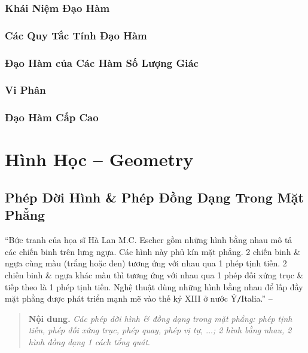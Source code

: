 \documentclass[oneside]{book}
\numberwithin{equation}{section}
\begin{document}
\section{Khái Niệm Đạo Hàm}

\section{Các Quy Tắc Tính Đạo Hàm}

\section{Đạo Hàm của Các Hàm Số Lượng Giác}

\section{Vi Phân}

\section{Đạo Hàm Cấp Cao}


\part{Hình Học -- Geometry}

\chapter{Phép Dời Hình \& Phép Đồng Dạng Trong Mặt Phẳng}

``Bức tranh của họa sĩ Hà Lan M.C. Escher gồm những hình bằng nhau mô tả các chiến binh trên lưng ngựa. Các hình này phủ kín mặt phẳng. 2 chiến binh \& ngựa cùng màu (trắng hoặc đen) tương ứng với nhau qua 1 phép tịnh tiến. 2 chiến binh \& ngựa khác màu thì tương ứng với nhau qua 1 phép đối xứng trục \& tiếp theo là 1 phép tịnh tiến. Nghệ thuật dùng những hình bằng nhau để lấp đầy mặt phẳng được phát triển mạnh mẽ vào thế kỷ XIII ở nước Ý\texttt{/}Italia.'' -- \cite[p. 3]{SGK_Toan_11_hinh_hoc_nang_cao}

\begin{quotation}
	\textbf{Nội dung.} \textit{Các phép dời hình \& đồng dạng trong mặt phẳng: phép tịnh tiến, phép đối xứng trục, phép quay, phép vị tự, $\ldots$; 2 hình bằng nhau, 2 hình đồng dạng 1 cách tổng quát}.
\end{quotation}
\end{document}
